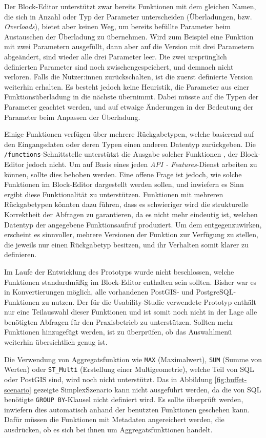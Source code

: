 Der Block-Editor unterstützt zwar bereits Funktionen mit dem gleichen Namen, die sich in Anzahl oder Typ der Parameter unterscheiden (Überladungen, bzw. \textit{Overloads}), bietet aber keinen Weg, um bereits befüllte Parameter beim Austauschen der Überladung zu übernehmen. Wird zum Beispiel eine Funktion mit zwei Parametern ausgefüllt, dann aber auf die Version mit drei Parametern abgeändert, sind wieder alle drei Parameter leer. Die zwei ursprünglich definierten Parameter sind noch zwischengespeichert, und demnach nicht verloren. Falls die Nutzer:innen zurückschalten, ist die zuerst definierte Version weiterhin erhalten. Es besteht jedoch keine Heuristik, die Parameter aus einer Funktionsüberladung in die nächste übernimmt. Dabei müsste auf die Typen der Parameter geachtet werden, und auf etwaige Änderungen in der Bedeutung der Parameter beim Anpassen der Überladung.

Einige Funktionen verfügen über mehrere Rückgabetypen, welche basierend auf den Eingangsdaten oder deren Typen einen anderen Datentyp zurückgeben. Die \texttt{/functions}-Schnittstelle unterstützt die Ausgabe solcher Funktionen , der Block-Editor jedoch nicht. Um auf Basis eines jeden \textit{API - Features}-Dienst arbeiten zu können, sollte dies behoben werden. Eine offene Frage ist jedoch, wie solche Funktionen im Block-Editor dargestellt werden sollen, und inwiefern es Sinn ergibt diese Funktionalität zu unterstützen. Funktionen mit mehreren Rückgabetypen könnten dazu führen, dass es schwieriger wird die strukturelle Korrektheit der Abfragen zu garantieren, da es nicht mehr eindeutig ist, welchen Datentyp der angegebene Funktionsaufruf produziert. Um dem entgegenzuwirken, erscheint es sinnvoller, mehrere Versionen der Funktion zur Verfügung zu stellen, die jeweils nur einen Rückgabetyp besitzen, und ihr Verhalten somit klarer zu definieren.

Im Laufe der Entwicklung des Prototyps wurde nicht beschlossen, welche Funktionen standardmäßig im Block-Editor enthalten sein sollten. Bisher war es in Konvertierungen möglich, alle vorhandenen PostGIS- und PostgreSQL-Funktionen zu nutzen. Der für die Usability-Studie verwendete Prototyp enthält nur eine Teilauswahl dieser Funktionen und ist somit noch nicht in der Lage alle benötigten Abfragen für den Praxisbetrieb zu unterstützen. Sollten mehr Funktionen hinzugefügt werden, ist zu überprüfen, ob das Auswahlmenü weiterhin übersichtlich genug ist.

Die Verwendung von Aggregatsfunktion wie \texttt{MAX} (Maximalwert), \texttt{SUM} (Summe von Werten) oder \texttt{ST\_Multi} (Erstellung einer Multigeometrie), welche Teil von \ac{SQL} oder PostGIS sind, wird noch nicht unterstützt. Das in Abbildung \ref{fig:buffet-scenario} gezeigte SimplexSzenario kann nicht ausgeführt werden, da die von \ac{SQL} benötigte \texttt{GROUP BY}-Klausel nicht definiert wird. Es sollte überprüft werden, inwiefern dies automatisch anhand der benutzten Funktionen geschehen kann. Dafür müssen die Funktionen mit Metadaten angereichert werden, die ausdrücken, ob es sich bei ihnen um Aggregatsfunktionen handelt.

